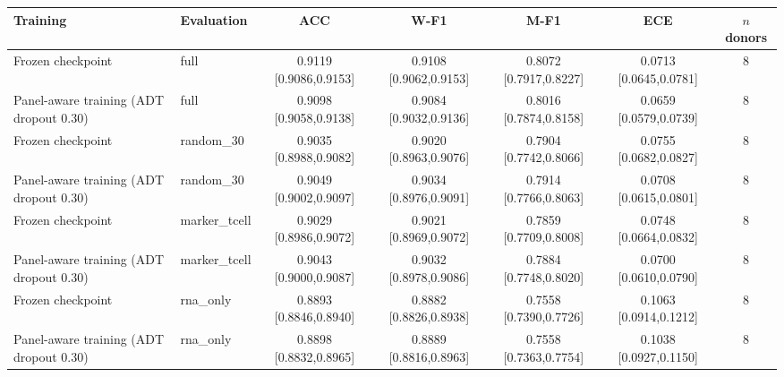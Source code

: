 \begin{tabular}{llccccc}
\toprule
Training & Evaluation & ACC & W-F1 & M-F1 & ECE & $n$ donors \\
\midrule
Frozen checkpoint & full & 0.9119 [0.9086,0.9153] & 0.9108 [0.9062,0.9153] & 0.8072 [0.7917,0.8227] & 0.0713 [0.0645,0.0781] & 8 \\
Panel-aware training (ADT dropout 0.30) & full & 0.9098 [0.9058,0.9138] & 0.9084 [0.9032,0.9136] & 0.8016 [0.7874,0.8158] & 0.0659 [0.0579,0.0739] & 8 \\
Frozen checkpoint & random\_30 & 0.9035 [0.8988,0.9082] & 0.9020 [0.8963,0.9076] & 0.7904 [0.7742,0.8066] & 0.0755 [0.0682,0.0827] & 8 \\
Panel-aware training (ADT dropout 0.30) & random\_30 & 0.9049 [0.9002,0.9097] & 0.9034 [0.8976,0.9091] & 0.7914 [0.7766,0.8063] & 0.0708 [0.0615,0.0801] & 8 \\
Frozen checkpoint & marker\_tcell & 0.9029 [0.8986,0.9072] & 0.9021 [0.8969,0.9072] & 0.7859 [0.7709,0.8008] & 0.0748 [0.0664,0.0832] & 8 \\
Panel-aware training (ADT dropout 0.30) & marker\_tcell & 0.9043 [0.9000,0.9087] & 0.9032 [0.8978,0.9086] & 0.7884 [0.7748,0.8020] & 0.0700 [0.0610,0.0790] & 8 \\
Frozen checkpoint & rna\_only & 0.8893 [0.8846,0.8940] & 0.8882 [0.8826,0.8938] & 0.7558 [0.7390,0.7726] & 0.1063 [0.0914,0.1212] & 8 \\
Panel-aware training (ADT dropout 0.30) & rna\_only & 0.8898 [0.8832,0.8965] & 0.8889 [0.8816,0.8963] & 0.7558 [0.7363,0.7754] & 0.1038 [0.0927,0.1150] & 8 \\
\bottomrule
\end{tabular}
